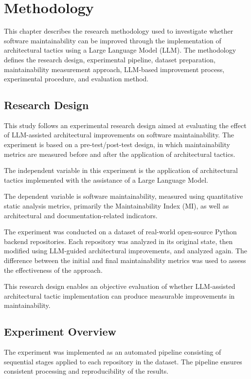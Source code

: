 \chapter{Methodology}
\label{chap:met}

This chapter describes the research methodology used to investigate whether software maintainability can be improved through the implementation of architectural tactics using a Large Language Model (LLM). The methodology defines the research design, experimental pipeline, dataset preparation, maintainability measurement approach, LLM-based improvement process, experimental procedure, and evaluation method.

\section{Research Design}

This study follows an experimental research design aimed at evaluating the effect of LLM-assisted architectural improvements on software maintainability. The experiment is based on a pre-test/post-test design, in which maintainability metrics are measured before and after the application of architectural tactics.

The independent variable in this experiment is the application of architectural tactics implemented with the assistance of a Large Language Model.

The dependent variable is software maintainability, measured using quantitative static analysis metrics, primarily the Maintainability Index (MI), as well as architectural and documentation-related indicators.

The experiment was conducted on a dataset of real-world open-source Python backend repositories. Each repository was analyzed in its original state, then modified using LLM-guided architectural improvements, and analyzed again. The difference between the initial and final maintainability metrics was used to assess the effectiveness of the approach.

This research design enables an objective evaluation of whether LLM-assisted architectural tactic implementation can produce measurable improvements in maintainability.

\section{Experiment Overview}

The experiment was implemented as an automated pipeline consisting of sequential stages applied to each repository in the dataset. The pipeline ensures consistent processing and reproducibility of the results.

